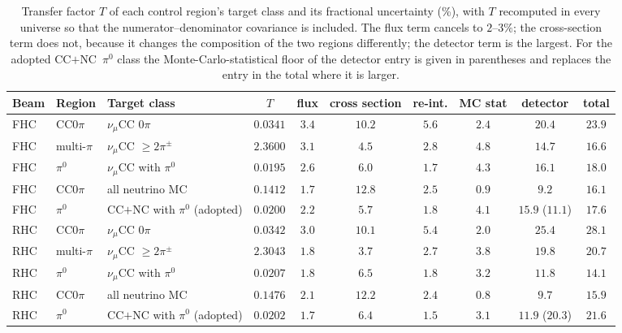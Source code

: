 \documentclass[11pt,a4paper]{article}
\begin{document}
\begin{table}[H]
  \centering
  \caption{Transfer factor $T$ of each control region's target class and its fractional uncertainty
    (\%), with $T$ recomputed in every universe so that the numerator--denominator covariance is
    included. The flux term cancels to $2$--$3\%$; the cross-section term does not, because it changes the
    composition of the two regions differently; the detector term is the largest. For the adopted
    CC$+$NC~$\pi^0$ class the Monte-Carlo-statistical floor of the detector entry is given in parentheses
    and replaces the entry in the total where it is larger.}
  \label{tab:cr_transfer_unc}
  \footnotesize\setlength{\tabcolsep}{3pt}
  \begin{tabular}{lllccccccc}
    \toprule
    Beam & Region & Target class & $T$ & flux & cross section & re-int. & MC stat & detector & total \\
    \midrule
    FHC & CC$0\pi$ & $\nu_\mu$CC $0\pi$ & $0.0341$ & $3.4$ & $10.2$ & $5.6$ & $2.4$ & $20.4$ & $23.9$ \\
    FHC & multi-$\pi$ & $\nu_\mu$CC $\geq2\pi^\pm$ & $2.3600$ & $3.1$ & $4.5$ & $2.8$ & $4.8$ & $14.7$ & $16.6$ \\
    FHC & $\pi^0$ & $\nu_\mu$CC with $\pi^0$ & $0.0195$ & $2.6$ & $6.0$ & $1.7$ & $4.3$ & $16.1$ & $18.0$ \\
    FHC & CC$0\pi$ & all neutrino MC & $0.1412$ & $1.7$ & $12.8$ & $2.5$ & $0.9$ & $9.2$ & $16.1$ \\
    FHC & $\pi^0$ & CC$+$NC with $\pi^0$ (adopted) & $0.0200$ & $2.2$ & $5.7$ & $1.8$ & $4.1$ & $15.9$ ($11.1$) & $17.6$ \\
    \midrule
    RHC & CC$0\pi$ & $\nu_\mu$CC $0\pi$ & $0.0342$ & $3.0$ & $10.1$ & $5.4$ & $2.0$ & $25.4$ & $28.1$ \\
    RHC & multi-$\pi$ & $\nu_\mu$CC $\geq2\pi^\pm$ & $2.3043$ & $1.8$ & $3.7$ & $2.7$ & $3.8$ & $19.8$ & $20.7$ \\
    RHC & $\pi^0$ & $\nu_\mu$CC with $\pi^0$ & $0.0207$ & $1.8$ & $6.5$ & $1.8$ & $3.2$ & $11.8$ & $14.1$ \\
    RHC & CC$0\pi$ & all neutrino MC & $0.1476$ & $2.1$ & $12.2$ & $2.4$ & $0.8$ & $9.7$ & $15.9$ \\
    RHC & $\pi^0$ & CC$+$NC with $\pi^0$ (adopted) & $0.0202$ & $1.7$ & $6.4$ & $1.5$ & $3.1$ & $11.9$ ($20.3$) & $21.6$ \\
    \bottomrule
  \end{tabular}
\end{table}
\end{document}
